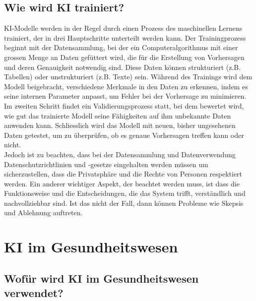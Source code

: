 \documentclass{report}
\begin{document}


    \newpage
\section {Wie wird KI trainiert?}

KI-Modelle werden in der Regel durch einen Prozess des maschinellen Lernens trainiert, 
der in drei Hauptschritte unterteilt werden kann. Der Trainingprozess beginnt mit der Datensammlung, 
bei der ein Computeralgorithmus mit einer grossen Menge an Daten gefüttert wird, die für die Erstellung 
von Vorhersagen und deren Genauigkeit notwendig sind. Diese Daten können strukturiert (z.B. Tabellen) oder 
unstrukturiert (z.B. Texte) sein. Während des Trainings wird dem Modell beigebracht, verschiedene Merkmale 
in den Daten zu erkennen, indem es seine internen Parameter anpasst, um Fehler bei der Vorhersage 
zu minimieren. \\ Im zweiten Schritt findet ein Validierungsprozess statt, bei dem bewertet wird, wie gut 
das trainierte Modell seine Fähigkeiten auf ihm unbekannte Daten anwenden kann. Schliesslich wird das Modell mit neuen, bisher 
ungesehenen Daten getestet, um zu überprüfen, ob es genaue Vorhersagen treffen kann oder nicht. 
\citep{clickworker}
\\
Jedoch ist zu beachten, dass bei der Datensammlung und Datenverwendung Datenschutzrichtlinien und -gesetze 
eingehalten werden müssen um sicherzustellen, dass die Privatsphäre und die Rechte von Personen respektiert 
werden. Ein anderer wichtiger Aspekt, der beachtet werden muss, ist dass die Funktionsweise und die 
Entscheidungen, die das System trifft, verständlich und nachvollziehbar sind. Ist das nicht der Fall, 
dann können Probleme wie Skepsis und Ablehnung auftreten. 


\chapter{KI im Gesundheitswesen}


\section{Wofür wird KI im Gesundheitswesen verwendet?}
\end{document}
